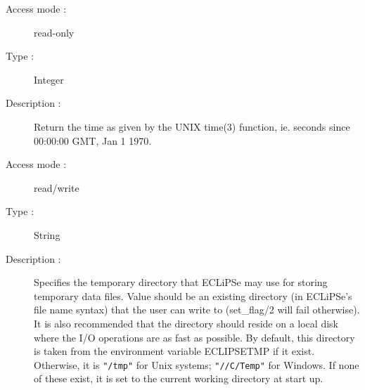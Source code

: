 \begin{description}
\begin{description}
\item[Access mode : ] read-only
\item[Type : ] Integer
\item[Description : ] Return the time as given by the UNIX time(3) function,
ie. seconds since 00:00:00 GMT, Jan 1 1970.
\end{description}

\begin{description}
\item[Access mode : ] read/write
\item[Type : ] String
\item[Description : ] Specifies the temporary directory that ECLiPSe may use
for storing temporary data files. Value should be an
existing directory (in ECLiPSe's file name syntax) that the user
can write to (set_flag/2 will fail otherwise). It is also
recommended that the directory should reside on a local disk where
the I/O operations are as fast as possible.   By default, this
directory is taken from the environment variable ECLIPSETMP if it
exist. Otherwise, it is {\tt "/tmp"} for Unix systems; {\tt "//C/Temp"} for
Windows. If none of these exist, it is set to the current
working directory at start up.
\end{description}



\end{description}
